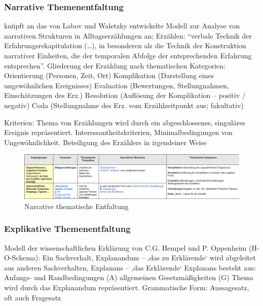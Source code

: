\documentclass[
  letterpaper,
]{scrbook}
\begin{document}
\hypertarget{narrative-themenentfaltung}{%
\subsubsection{Narrative
Themenentfaltung}\label{narrative-themenentfaltung}}

knüpft an das von Labov und Waletzky entwickelte Modell zur Analyse von
narrativen Strukturen in Alltagserzählungen an; Erzählen: ``verbale
Technik der Erfahrungsrekapitulation (\ldots), in besonderen als die
Technik der Konstruktion narrativer Einheiten, die der temporalen
Abfolge der entsprechenden Erfahrung entsprechen''. Gliederung der
Erzählung nach thematischen Kategorien: Orientierung (Personen, Zeit,
Ort) Komplikation (Darstellung eines ungewöhnlichen Ereignisses)
Evaluation (Bewertungen, Stellungnahmen, Einschätzungen des Erz.)
Resolution (Auflösung der Komplikation -- positiv / negativ) Coda
(Stellungnahme des Erz. vom Erzählzeitpunkt aus; fakultativ)

Kriterien: Thema von Erzählungen wird durch ein abgeschlossenes,
singuläres Ereignis repräsentiert. Interessantheitskriterien,
Minimalbedingungen von Ungewöhnlichkeit. Beteiligung des Erzählers in
irgendeiner Weise

\begin{figure}

{\centering \includegraphics[width=1\textwidth,height=\textheight]{./pictures/Themenentfaltung_narrative.png}

}

\caption{Narrative thematische Entfaltung}

\end{figure}

\hypertarget{explikative-themenentfaltung}{%
\subsubsection{Explikative
Themenentfaltung}\label{explikative-themenentfaltung}}

Modell der wissenschaftlichen Erklärung von C.G. Hempel und P. Oppenheim
(H-O-Schema): Ein Sachverhalt, Explanandum -- ‚das zu Erklärende` wird
abgeleitet aus anderen Sachverhalten, Explanans -- ‚das Erklärende`
Explanans besteht aus: Anfangs- und Randbedingungen (A) allgemeinen
Gesetzmäßigkeiten (G) Thema wird durch das Explanandum repräsentiert.
Grammatische Form: Aussagesatz, oft auch Fragesatz
\end{document}
